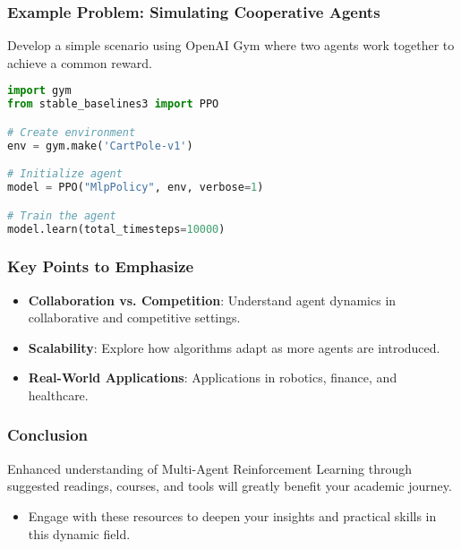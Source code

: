 \documentclass[aspectratio=169]{beamer}
\begin{document}
\begin{frame}[fragile]
    \frametitle{Example Problem: Simulating Cooperative Agents}
    Develop a simple scenario using OpenAI Gym where two agents work together to achieve a common reward.
    \begin{lstlisting}[language=Python]
import gym
from stable_baselines3 import PPO

# Create environment
env = gym.make('CartPole-v1')

# Initialize agent
model = PPO("MlpPolicy", env, verbose=1)

# Train the agent
model.learn(total_timesteps=10000)
    \end{lstlisting}
\end{frame}

\begin{frame}
    \frametitle{Key Points to Emphasize}
    \begin{itemize}
        \item \textbf{Collaboration vs. Competition}: Understand agent dynamics in collaborative and competitive settings.
        \item \textbf{Scalability}: Explore how algorithms adapt as more agents are introduced.
        \item \textbf{Real-World Applications}: Applications in robotics, finance, and healthcare.
    \end{itemize}
\end{frame}

\begin{frame}
    \frametitle{Conclusion}
    Enhanced understanding of Multi-Agent Reinforcement Learning through suggested readings, courses, and tools will greatly benefit your academic journey. 
    \begin{itemize}
        \item Engage with these resources to deepen your insights and practical skills in this dynamic field.
    \end{itemize}
\end{frame}
\end{document}
